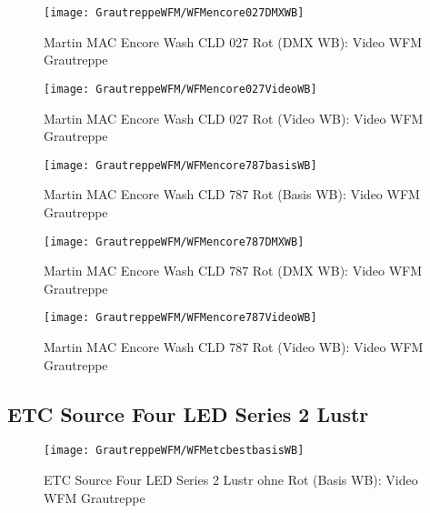 \documentclass[pagesize,paper=A4,fontsize=12pt,utf8,numbers=noenddot,bibliography=totoc,listof=totoc,DIV=11,BCOR=1mm]{scrreprt}
\begin{document}
\begin{figure}[htp]     %
\centering
\texttt{[image: GrautreppeWFM/WFMencore027DMXWB]} 
\caption {Martin MAC Encore Wash CLD 027 Rot (DMX WB): Video WFM Grautreppe} 
\end{figure}

\begin{figure}[htp]     %
\centering
\texttt{[image: GrautreppeWFM/WFMencore027VideoWB]} 
\caption {Martin MAC Encore Wash CLD 027 Rot (Video WB): Video WFM Grautreppe} 
\end{figure}



\begin{figure}[htp]     %
\centering
\texttt{[image: GrautreppeWFM/WFMencore787basisWB]} 
\caption {Martin MAC Encore Wash CLD 787 Rot (Basis WB): Video WFM Grautreppe} 
\end{figure}

\begin{figure}[htp]     %
\centering
\texttt{[image: GrautreppeWFM/WFMencore787DMXWB]} 
\caption {Martin MAC Encore Wash CLD 787 Rot (DMX WB): Video WFM Grautreppe} 
\end{figure}

\begin{figure}[htp]     %
\centering
\texttt{[image: GrautreppeWFM/WFMencore787VideoWB]} 
\caption {Martin MAC Encore Wash CLD 787 Rot (Video WB): Video WFM Grautreppe} 
\end{figure}



\subsection{ETC Source Four LED Series 2 Lustr}

\begin{figure}[htp]     %
\centering
\texttt{[image: GrautreppeWFM/WFMetcbestbasisWB]} 
\caption {ETC Source Four LED Series 2 Lustr ohne Rot (Basis WB): Video WFM Grautreppe} 
\end{figure}
\end{document}
